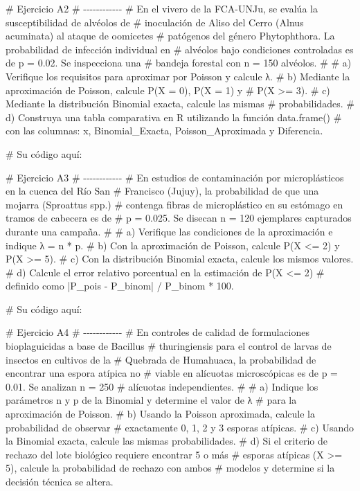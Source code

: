 \documentclass[
  spanish,
  letterpaper,
  DIV=11,
  numbers=noendperiod]{scrreprt}
\newenvironment{Shaded}{\begin{snugshade}}{\end{snugshade}}
\newcommand{\CommentTok}[1]{\textcolor[rgb]{0.37,0.37,0.37}{#1}}
\begin{document}
\begin{Shaded}
\begin{Highlighting}[]
\CommentTok{\# Ejercicio A2}
\CommentTok{\# {-}{-}{-}{-}{-}{-}{-}{-}{-}{-}{-}{-}}
\CommentTok{\# En el vivero de la FCA{-}UNJu, se evalúa la susceptibilidad de alvéolos de}
\CommentTok{\# inoculación de Aliso del Cerro (Alnus acuminata) al ataque de oomicetes}
\CommentTok{\# patógenos del género Phytophthora. La probabilidad de infección individual en}
\CommentTok{\# alvéolos bajo condiciones controladas es de p = 0.02. Se inspecciona una}
\CommentTok{\# bandeja forestal con n = 150 alvéolos.}
\CommentTok{\#}
\CommentTok{\# a) Verifique los requisitos para aproximar por Poisson y calcule λ.}
\CommentTok{\# b) Mediante la aproximación de Poisson, calcule P(X = 0), P(X = 1) y}
\CommentTok{\#    P(X \textgreater{}= 3).}
\CommentTok{\# c) Mediante la distribución Binomial exacta, calcule las mismas}
\CommentTok{\#    probabilidades.}
\CommentTok{\# d) Construya una tabla comparativa en R utilizando la función data.frame()}
\CommentTok{\#    con las columnas: x, Binomial\_Exacta, Poisson\_Aproximada y Diferencia.}

\CommentTok{\# Su código aquí:}


\CommentTok{\# Ejercicio A3}
\CommentTok{\# {-}{-}{-}{-}{-}{-}{-}{-}{-}{-}{-}{-}}
\CommentTok{\# En estudios de contaminación por microplásticos en la cuenca del Río San}
\CommentTok{\# Francisco (Jujuy), la probabilidad de que una mojarra (Sproattus spp.)}
\CommentTok{\# contenga fibras de microplástico en su estómago en tramos de cabecera es de}
\CommentTok{\# p = 0.025. Se disecan n = 120 ejemplares capturados durante una campaña.}
\CommentTok{\#}
\CommentTok{\# a) Verifique las condiciones de la aproximación e indique λ = n * p.}
\CommentTok{\# b) Con la aproximación de Poisson, calcule P(X \textless{}= 2) y P(X \textgreater{}= 5).}
\CommentTok{\# c) Con la distribución Binomial exacta, calcule los mismos valores.}
\CommentTok{\# d) Calcule el error relativo porcentual en la estimación de P(X \textless{}= 2)}
\CommentTok{\#    definido como |P\_pois {-} P\_binom| / P\_binom * 100.}

\CommentTok{\# Su código aquí:}


\CommentTok{\# Ejercicio A4}
\CommentTok{\# {-}{-}{-}{-}{-}{-}{-}{-}{-}{-}{-}{-}}
\CommentTok{\# En controles de calidad de formulaciones bioplaguicidas a base de Bacillus}
\CommentTok{\# thuringiensis para el control de larvas de insectos en cultivos de la}
\CommentTok{\# Quebrada de Humahuaca, la probabilidad de encontrar una espora atípica no}
\CommentTok{\# viable en alícuotas microscópicas es de p = 0.01. Se analizan n = 250}
\CommentTok{\# alícuotas independientes.}
\CommentTok{\#}
\CommentTok{\# a) Indique los parámetros n y p de la Binomial y determine el valor de λ}
\CommentTok{\#    para la aproximación de Poisson.}
\CommentTok{\# b) Usando la Poisson aproximada, calcule la probabilidad de observar}
\CommentTok{\#    exactamente 0, 1, 2 y 3 esporas atípicas.}
\CommentTok{\# c) Usando la Binomial exacta, calcule las mismas probabilidades.}
\CommentTok{\# d) Si el criterio de rechazo del lote biológico requiere encontrar 5 o más}
\CommentTok{\#    esporas atípicas (X \textgreater{}= 5), calcule la probabilidad de rechazo con ambos}
\CommentTok{\#    modelos y determine si la decisión técnica se altera.}


\end{Highlighting}
\end{Shaded}
\end{document}
